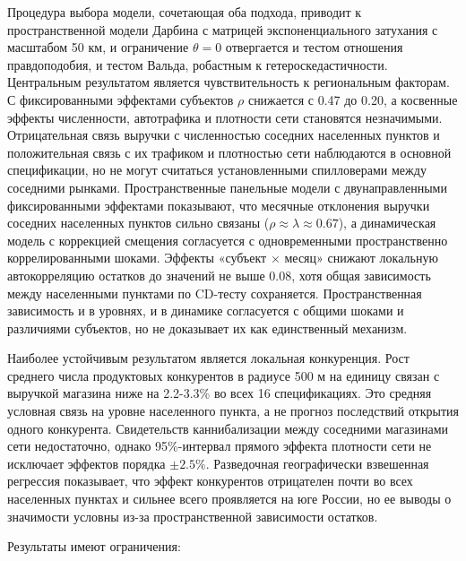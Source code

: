 \documentclass[12pt, a4paper]{article}
\begin{document}
Процедура выбора модели, сочетающая оба подхода, приводит к пространственной модели Дарбина с
матрицей экспоненциального затухания с масштабом 50 км, и ограничение $\theta = 0$ отвергается и
тестом отношения правдоподобия, и тестом Вальда, робастным к гетероскедастичности. Центральным
результатом является чувствительность к региональным факторам. С фиксированными эффектами
субъектов $\rho$ снижается с 0.47 до 0.20, а косвенные эффекты численности, автотрафика и
плотности сети становятся незначимыми. Отрицательная связь выручки с численностью соседних
населенных пунктов и положительная связь с их трафиком и плотностью сети наблюдаются в основной
спецификации, но не могут считаться установленными спилловерами между соседними рынками.
Пространственные панельные модели с двунаправленными фиксированными эффектами показывают, что
месячные отклонения выручки соседних населенных пунктов сильно связаны ($\rho \approx \lambda \approx 0.67$),
а динамическая модель с коррекцией смещения согласуется с одновременными пространственно
коррелированными шоками. Эффекты «субъект $\times$ месяц» снижают локальную автокорреляцию остатков
до значений не выше 0.08, хотя общая зависимость между населенными пунктами по CD-тесту сохраняется.
Пространственная зависимость и в уровнях, и в динамике согласуется с общими шоками и различиями
субъектов, но не доказывает их как единственный механизм.

Наиболее устойчивым результатом является локальная конкуренция. Рост среднего числа продуктовых
конкурентов в радиусе 500 м на единицу связан с выручкой магазина ниже на 2.2-3.3\% во всех 16
спецификациях. Это средняя условная связь на уровне населенного пункта, а не прогноз последствий
открытия одного конкурента. Свидетельств каннибализации между соседними магазинами сети
недостаточно, однако 95\%-интервал прямого эффекта плотности сети не исключает эффектов порядка
$\pm 2.5\%$. Разведочная географически взвешенная регрессия показывает, что эффект конкурентов
отрицателен почти во всех населенных пунктах и сильнее всего проявляется на юге России, но ее выводы о
значимости условны из-за пространственной зависимости остатков.

Результаты имеют ограничения:
\end{document}
